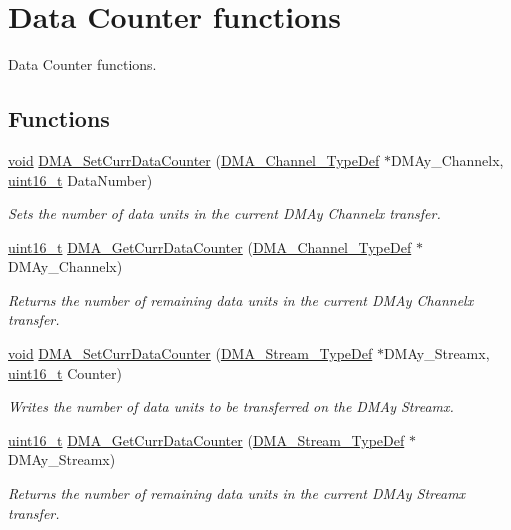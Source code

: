 \hypertarget{group___d_m_a___group2}{\section{Data Counter functions}
\label{group___d_m_a___group2}
}


Data Counter functions.  


\subsection*{Functions}
\begin{DoxyCompactItemize}
\item 
\hyperlink{group___n_a_m_e_ga18028b8badbf1ea7e704ccac3c488e82}{void} \hyperlink{group___d_m_a___group2_gade5d9e532814eaa46514cb385fdff709}{D\-M\-A\-\_\-\-Set\-Curr\-Data\-Counter} (\hyperlink{struct_d_m_a___channel___type_def}{D\-M\-A\-\_\-\-Channel\-\_\-\-Type\-Def} $\ast$D\-M\-Ay\-\_\-\-Channelx, \hyperlink{stdint_8h_a273cf69d639a59973b6019625df33e30}{uint16\-\_\-t} Data\-Number)
\begin{DoxyCompactList}\small\item\em Sets the number of data units in the current D\-M\-Ay Channelx transfer. \end{DoxyCompactList}\item 
\hyperlink{stdint_8h_a273cf69d639a59973b6019625df33e30}{uint16\-\_\-t} \hyperlink{group___d_m_a___group2_ga511b4c402d1ff32d53f28736956cac5d}{D\-M\-A\-\_\-\-Get\-Curr\-Data\-Counter} (\hyperlink{struct_d_m_a___channel___type_def}{D\-M\-A\-\_\-\-Channel\-\_\-\-Type\-Def} $\ast$D\-M\-Ay\-\_\-\-Channelx)
\begin{DoxyCompactList}\small\item\em Returns the number of remaining data units in the current D\-M\-Ay Channelx transfer. \end{DoxyCompactList}\item 
\hyperlink{group___n_a_m_e_ga18028b8badbf1ea7e704ccac3c488e82}{void} \hyperlink{group___d_m_a___group2_ga6a11a2c951cff59b125ba8857d44e3f3}{D\-M\-A\-\_\-\-Set\-Curr\-Data\-Counter} (\hyperlink{struct_d_m_a___stream___type_def}{D\-M\-A\-\_\-\-Stream\-\_\-\-Type\-Def} $\ast$D\-M\-Ay\-\_\-\-Streamx, \hyperlink{stdint_8h_a273cf69d639a59973b6019625df33e30}{uint16\-\_\-t} Counter)
\begin{DoxyCompactList}\small\item\em Writes the number of data units to be transferred on the D\-M\-Ay Streamx. \end{DoxyCompactList}\item 
\hyperlink{stdint_8h_a273cf69d639a59973b6019625df33e30}{uint16\-\_\-t} \hyperlink{group___d_m_a___group2_ga4a76444a92423f5f15a4328738d6dc46}{D\-M\-A\-\_\-\-Get\-Curr\-Data\-Counter} (\hyperlink{struct_d_m_a___stream___type_def}{D\-M\-A\-\_\-\-Stream\-\_\-\-Type\-Def} $\ast$D\-M\-Ay\-\_\-\-Streamx)
\begin{DoxyCompactList}\small\item\em Returns the number of remaining data units in the current D\-M\-Ay Streamx transfer. \end{DoxyCompactList}\end{DoxyCompactItemize}


